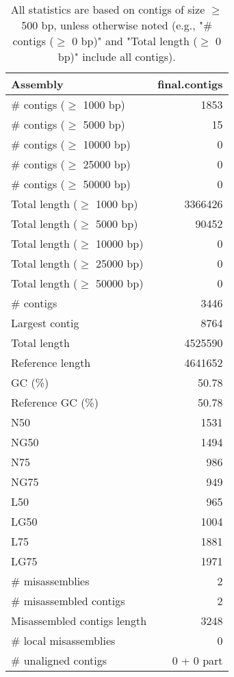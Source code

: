 \documentclass[12pt,a4paper]{article}
\begin{document}
\begin{table}[ht]
\begin{center}
\caption{All statistics are based on contigs of size $\geq$ 500 bp, unless otherwise noted (e.g., "\# contigs ($\geq$ 0 bp)" and "Total length ($\geq$ 0 bp)" include all contigs).}
\begin{tabular}{|l*{1}{|r}|}
\hline
Assembly & final.contigs \\ \hline
\# contigs ($\geq$ 1000 bp) & 1853 \\ \hline
\# contigs ($\geq$ 5000 bp) & 15 \\ \hline
\# contigs ($\geq$ 10000 bp) & 0 \\ \hline
\# contigs ($\geq$ 25000 bp) & 0 \\ \hline
\# contigs ($\geq$ 50000 bp) & 0 \\ \hline
Total length ($\geq$ 1000 bp) & 3366426 \\ \hline
Total length ($\geq$ 5000 bp) & 90452 \\ \hline
Total length ($\geq$ 10000 bp) & 0 \\ \hline
Total length ($\geq$ 25000 bp) & 0 \\ \hline
Total length ($\geq$ 50000 bp) & 0 \\ \hline
\# contigs & 3446 \\ \hline
Largest contig & 8764 \\ \hline
Total length & 4525590 \\ \hline
Reference length & 4641652 \\ \hline
GC (\%) & 50.78 \\ \hline
Reference GC (\%) & 50.78 \\ \hline
N50 & 1531 \\ \hline
NG50 & 1494 \\ \hline
N75 & 986 \\ \hline
NG75 & 949 \\ \hline
L50 & 965 \\ \hline
LG50 & 1004 \\ \hline
L75 & 1881 \\ \hline
LG75 & 1971 \\ \hline
\# misassemblies & 2 \\ \hline
\# misassembled contigs & 2 \\ \hline
Misassembled contigs length & 3248 \\ \hline
\# local misassemblies & 0 \\ \hline
\# unaligned contigs & 0 + 0 part \\ \hline

\end{tabular}
\end{center}
\end{table}
\end{document}
